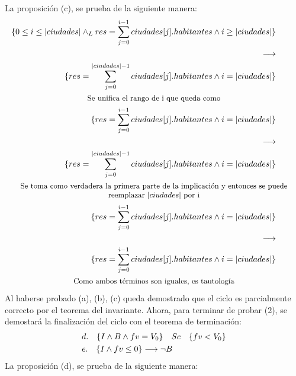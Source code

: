 \documentclass[50pt,a4paper]{article}
\newcommand{\invariante}[1]{0 \leq #1 \leq |ciudades| \yLuego res = \sum\limits_{j=0}^{#1 - 1} ciudades[j].habitantes}
\begin{document}
\indent
La proposición (c), se prueba de la siguiente manera:
\begin{align*}
    \{ \invariante{i} \land i \geq |ciudades| \}\\
     \implica \\
    \{ res = \sum\limits_{j=0}^{|ciudades| - 1} ciudades[j].habitantes \land i = |ciudades| \}\\
     \shortintertext{\parbox{\textwidth}{\centering \small {Se unifica el rango de i que queda como}}} \notag
     \{ res = \sum\limits_{j=0}^{i - 1} ciudades[j].habitantes \land i = |ciudades| \}\\
     \implica \\
    \{ res = \sum\limits_{j=0}^{|ciudades| - 1} ciudades[j].habitantes \land i = |ciudades| \}\\
\shortintertext{\parbox{\textwidth}{\centering \small {Se toma como verdadera la primera parte de la implicación y entonces se puede reemplazar $|ciudades|$ por i}}} \notag
     \{ res = \sum\limits_{j=0}^{i - 1} ciudades[j].habitantes \land i = |ciudades| \}\\
     \implica \\
    \{ res = \sum\limits_{j=0}^{i - 1} ciudades[j].habitantes \land i = |ciudades| \}\\
	\shortintertext{\parbox{\textwidth}{\centering \small {Como ambos términos son iguales, es tautología}}}
\end{align*}
\indent
Al haberse probado (a), (b), (c) queda demostrado que el ciclo es parcialmente correcto por el teorema del invariante. Ahora, para terminar de probar (2), se demostará la finalización del ciclo con el teorema de terminación:
\begin{align*}
    &d.\quad \{ I \land B \land fv = V_{0} \}\quad Sc \quad\{ fv < V_{0} \} \\
    &e.\quad \{ I \land fv \leq 0 \} \longrightarrow \neg B\\
\end{align*}
\indent
La proposición (d), se prueba de la siguiente manera:
\end{document}
